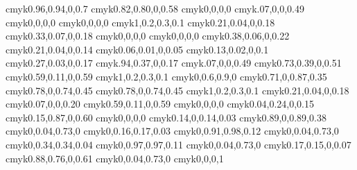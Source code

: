 \definecolor{firstpagetop@bg@color} 		{cmyk}{0.96,0.94,0,0.7}
\definecolor{firstpagebottom@bg@color}	{cmyk}{0.82,0.80,0,0.58}
\definecolor{titledoc@color}				{cmyk}{0,0,0,0}
\definecolor{firstpage@lines@color}		{cmyk}{.07,0,0,0.49}
\definecolor{titleauthor@color}			{cmyk}{0,0,0,0}
\definecolor{titledate@color}			{cmyk}{0,0,0,0}
\definecolor{chapter@bg@color}			{cmyk}{1,0.2,0.3,0.1}
\definecolor{chapterdegrade@color}		{cmyk}{0.21,0.04,0,0.18}
\definecolor{chapterellipse@bg@color}	{cmyk}{0.33,0.07,0,0.18}
\definecolor{chapterellipse@color}		{cmyk}{0,0,0,0}
\definecolor{chaptertitlename@color}		{cmyk}{0,0,0,0}
\definecolor{chapterrule@color}			{cmyk}{0.38,0.06,0,0.22}
\definecolor{chaptermidcircle@color}		{cmyk}{0.21,0.04,0,0.14}
\definecolor{chapterbotcircle@color}		{cmyk}{0.06,0.01,0,0.05}
\definecolor{chaptertopcircle@color}		{cmyk}{0.13,0.02,0,0.1}
\definecolor{chapterline@color}			{cmyk}{0.27,0.03,0,0.17}
\definecolor{pagenumber@bg@color}		{cmyk}{.94,0.37,0,0.17}
\definecolor{shadow@color}				{cmyk}{.07,0,0,0.49}
\definecolor{chapterintro@color}			{cmyk}{0.73,0.39,0,0.51}
\definecolor{chapter@title@color}		{cmyk}{0.59,0.11,0,0.59}
\definecolor{section@title@color}		{cmyk}{1,0.2,0.3,0.1}
\definecolor{subsection@title@color}		{cmyk}{0,0.6,0.9,0}
\definecolor{subsubsection@title@color}	{cmyk}{0.71,0,0.87,0.35}
\definecolor{paragraph@title@color}		{cmyk}{0.78,0,0.74,0.45}
\definecolor{subparagraph@title@color}	{cmyk}{0.78,0,0.74,0.45}
\definecolor{arrayrule@color}			{cmyk}{1,0.2,0.3,0.1}
\definecolor{cell@color}					{cmyk}{0.21,0.04,0,0.18}
\definecolor{rem@bg@color}				{cmyk}{0.07,0,0,0.20}
\definecolor{remtitle@bg@color}			{cmyk}{0.59,0.11,0,0.59}
\definecolor{remtitle@color}				{cmyk}{0,0,0,0}
\definecolor{meth@bg@color}				{cmyk}{0.04,0.24,0,0.15}
\definecolor{methtitle@bg@color}			{cmyk}{0.15,0.87,0,0.60}
\definecolor{methtitle@color}			{cmyk}{0,0,0,0}
\definecolor{def@bg@color}				{cmyk}{0.14,0,0.14,0.03}
\definecolor{deftitle@bg@color}			{cmyk}{0.89,0,0.89,0.38}
\definecolor{deftitle@color}				{cmyk}{0,0.04,0.73,0}
\definecolor{prop@bg@color}				{cmyk}{0,0.16,0.17,0.03}
\definecolor{proptitle@bg@color}			{cmyk}{0,0.91,0.98,0.12}
\definecolor{proptitle@color}			{cmyk}{0,0.04,0.73,0}
\definecolor{thm@bg@color}				{cmyk}{0,0.34,0.34,0.04}
\definecolor{thmtitle@bg@color}			{cmyk}{0,0.97,0.97,0.11}
\definecolor{thmtitle@color}				{cmyk}{0,0.04,0.73,0}
\definecolor{ex@bg@color}				{cmyk}{0.17,0.15,0,0.07}
\definecolor{extitle@bg@color}			{cmyk}{0.88,0.76,0,0.61}
\definecolor{extitle@color}				{cmyk}{0,0.04,0.73,0}
\definecolor{dem@border@color}			{cmyk}{0,0,0,1}
